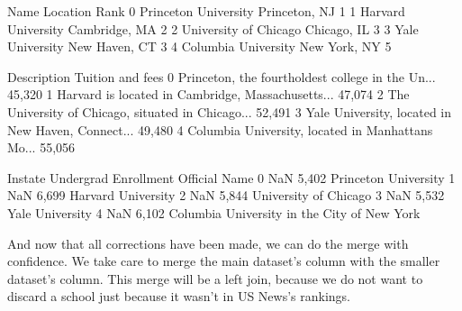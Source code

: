 \documentclass[letterpaper,10pt,english]{jupyterBook}
\begin{document}
\begin{sphinxVerbatim}[commandchars=\\\{\}]
                    Name       Location  Rank  \PYGZbs{}
0   Princeton University  Princeton, NJ     1   
1     Harvard University  Cambridge, MA     2   
2  University of Chicago    Chicago, IL     3   
3        Yale University  New Haven, CT     3   
4    Columbia University   New York, NY     5   

                                         Description Tuition and fees  \PYGZbs{}
0  Princeton, the fourth\PYGZhy{}oldest college in the Un...         \PYGZdl{}45,320    
1  Harvard is located in Cambridge, Massachusetts...         \PYGZdl{}47,074    
2  The University of Chicago, situated in Chicago...         \PYGZdl{}52,491    
3  Yale University, located in New Haven, Connect...         \PYGZdl{}49,480    
4  Columbia University, located in Manhattan\PYGZsq{}s Mo...         \PYGZdl{}55,056    

  In\PYGZhy{}state Undergrad Enrollment                                Official Name  
0      NaN                5,402                         Princeton University  
1      NaN                6,699                           Harvard University  
2      NaN                5,844                        University of Chicago  
3      NaN                5,532                              Yale University  
4      NaN                6,102  Columbia University in the City of New York  
\end{sphinxVerbatim}

\sphinxAtStartPar
{} And now that all corrections have been made, we can do the merge with confidence.  We take care to merge the main dataset’s  column with the smaller dataset’s  column.  This merge will be a left join, because we do not want to discard a school just because it wasn’t in US News’s rankings.

\begin{sphinxVerbatim}[commandchars=\\\{\}]
        
\end{sphinxVerbatim}
\end{document}

